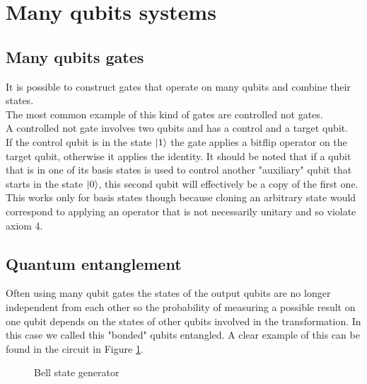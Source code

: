 \documentclass{article}
\begin{document}
\section{Many qubits systems}



\subsection{Many qubits gates}
It is possible to construct gates that operate on many qubits and combine their states.\\
The most common example of this kind of gates are controlled not gates.\\
A controlled not gate involves two qubits and has a control and a target qubit.\\
If the control qubit is in the state $\ket{1}$ the gate applies a bitflip
operator on the target qubit, otherwise it applies the identity.
It should be noted that if a qubit that is in one of its basis states
is used to control another "auxiliary" qubit that starts in the state
$\ket{0}$, this second qubit will effectively be a copy of the first one.
This works only for basis states though because cloning an arbitrary
state would correspond to applying an operator that is not necessarily
unitary and so violate axiom 4.



\subsection{Quantum entanglement}

Often using many qubit gates the states of the output qubits are no longer
independent from each other so the probability of measuring a possible result
on one qubit depends on the states of other qubits involved in the transformation.
In this case we called this "bonded" qubits entangled.
A clear example of this can be found in the circuit in Figure \ref{entanglement}.\\

\begin{figure}[H]
	\centering
	\caption{Bell state generator}
	\label{entanglement}
\end{figure}
\end{document}
